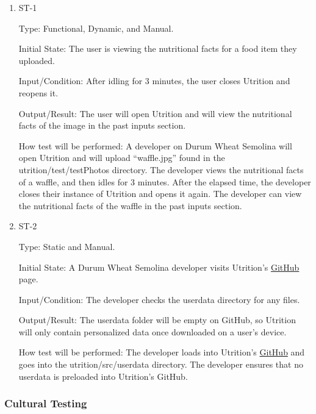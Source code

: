 \documentclass[12pt, titlepage]{article}
\begin{document}
	\begin{enumerate}
		
		\item{ST-1} 
		
		Type: Functional, Dynamic, and Manual.
		
		Initial State: The user is viewing the nutritional facts for a food item they uploaded.
		
		Input/Condition: After idling for 3 minutes, the user closes Utrition and reopens it.
		
		Output/Result: The user will open Utrition and will view the nutritional facts of the image in the past inputs section.
		
		How test will be performed: A developer on Durum Wheat Semolina will open Utrition and will upload “waffle.jpg” found in the utrition/test/testPhotos directory. The developer views the nutritional facts of a waffle, and then idles for 3 minutes. After the elapsed time, the developer closes their instance of Utrition and opens it again. The developer can view the nutritional facts of the waffle in the past inputs section.
		
		\item{ST-2} 
		
		Type: Static and Manual.
		
		Initial State: A Durum Wheat Semolina developer visits Utrition’s \href{https://github.com/jeff-rey-wang/utrition/}{GitHub} page.
		
		Input/Condition: The developer checks the userdata directory for any files.
		
		Output/Result: The userdata folder will be empty on GitHub, so Utrition will only contain personalized data once downloaded on a user's device.
		
		How test will be performed: The developer loads into Utrition’s \href{https://github.com/jeff-rey-wang/utrition/}{GitHub} and goes into the utrition/src/userdata directory. The developer ensures that no userdata is preloaded into Utrition’s GitHub.
		
		
	\end{enumerate}
	
	\subsubsection{Cultural Testing}
	
	
\end{document}
